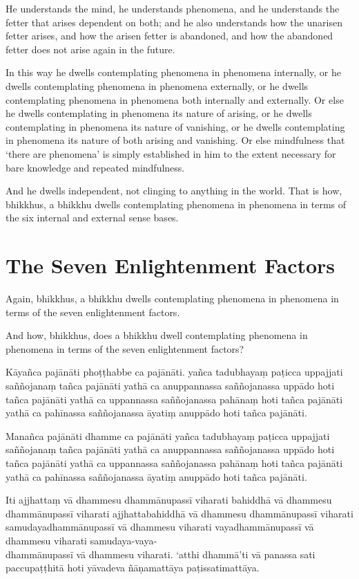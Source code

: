 He understands the mind, he understands phenomena, and he understands the fetter
that arises dependent on both; and he also understands how the unarisen fetter
arises, and how the arisen fetter is abandoned, and how the abandoned fetter
does not arise again in the future.

In this way he dwells contemplating phenomena in phenomena internally, or he
dwells contemplating phenomena in phenomena externally, or he dwells
contemplating phenomena in phenomena both internally and externally. Or else he
dwells contemplating in phenomena its nature of arising, or he dwells
contemplating in phenomena its nature of vanishing, or he dwells contemplating
in phenomena its nature of both arising and vanishing. Or else mindfulness that
‘there are phenomena’ is simply established in him to the extent necessary for
bare knowledge and repeated mindfulness.

And he dwells independent, not clinging to anything in the world. That is how,
bhikkhus, a bhikkhu dwells contemplating phenomena in phenomena in terms of the
six internal and external sense bases.


\section{The Seven Enlightenment Factors}

Again, bhikkhus, a bhikkhu dwells contemplating phenomena in phenomena in terms
of the seven enlightenment factors.

And how, bhikkhus, does a bhikkhu dwell contemplating phenomena in phenomena in
terms of the seven enlightenment factors?

\paliPage

Kāyañca pajānāti phoṭṭhabbe ca pajānāti. yañca tadubhayaṃ paṭicca uppajjati
saññojanaṃ tañca pajānāti yathā ca anuppannassa saññojanassa uppādo hoti tañca
pajānāti yathā ca uppannassa saññojanassa pahānaṃ hoti tañca pajānāti yathā ca
pahīnassa saññojanassa āyatiṃ anuppādo hoti tañca pajānāti.

Manañca pajānāti dhamme ca pajānāti yañca tadubhayaṃ paṭicca uppajjati
saññojanaṃ tañca pajānāti yathā ca anuppannassa saññojanassa uppādo hoti tañca
pajānāti yathā ca uppannassa saññojanassa pahānaṃ hoti tañca pajānāti yathā ca
pahīnassa saññojanassa āyatiṃ anuppādo hoti tañca pajānāti.

Iti ajjhattaṃ vā dhammesu dhammānupassī viharati bahiddhā vā dhammesu
dhammānupassī viharati ajjhattabahiddhā vā dhammesu dhammānupassī viharati
samudayadhammānupassī vā dhammesu viharati vayadhammānupassī vā dhammesu
viharati samudaya-vaya-\\
dhammānupassī vā dhammesu viharati. `atthi dhammā'ti vā
panassa sati paccupaṭṭhitā hoti yāvadeva ñāṇamattāya paṭissatimattāya.

